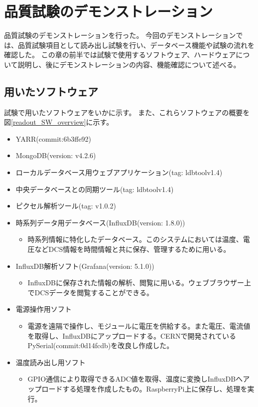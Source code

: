 \chapter{品質試験のデモンストレーション} \label{chap:demo}
品質試験のデモンストレーションを行った。
今回のデモンストレーションでは、品質試験項目として読み出し試験を行い、データベース機能や試験の流れを確認した。
この章の前半では試験で使用するソフトウェア、ハードウェアについて説明し、後にデモンストレーションの内容、機能確認について述べる。

\section{用いたソフトウェア}

試験で用いたソフトウェアをいかに示す。
また、これらソフトウェアの概要を図\ref{readout_SW_overview}に示す。
\begin{itemize}
  \item YARR(commit:6b3ffe92)
  \item MongoDB(version: v4.2.6)
  \item ローカルデータベース用ウェブアプリケーション(tag: ldbtoolv1.4)
  \item 中央データベースとの同期ツール(tag: ldbtoolv1.4)
  \item ピクセル解析ツール(tag: v1.0.2)
  \item 時系列データ用データベース(InfluxDB\cite{5-6}(version: 1.8.0))
    \begin{itemize}
      \item 時系列情報に特化したデータベース。このシステムにおいては温度、電圧などDCS情報を時間情報と共に保存、管理するために用いる。
    \end{itemize}
  \item InfluxDB解析ソフト(Grafana\cite{5-7}(version: 5.1.0))
    \begin{itemize}
      \item InfluxDBに保存された情報の解析、閲覧に用いる。ウェブブラウザー上でDCSデータを閲覧することができる。
    \end{itemize}
  \item 電源操作用ソフト
    \begin{itemize}
      \item 電源を遠隔で操作し、モジュールに電圧を供給する。また電圧、電流値を取得し、InfluxDBにアップロードする。CERNで開発されているPySerial\cite{5-8}(commit:0d14fcdb)を改良し作成した。
    \end{itemize}
  \item 温度読み出し用ソフト
    \begin{itemize}
      \item GPIO通信により取得できるADC値を取得、温度に変換しInfluxDBへアップロードする処理を作成したもの。RaspberryPi上に保存し、処理を実行。
    \end{itemize}
\end{itemize}

